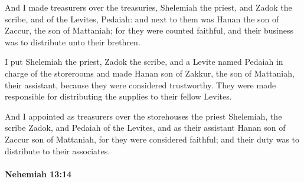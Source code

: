 			\begin{versebox}
					\item[BHS] 
					\item[LXX] 
					\item[ASV] And I made treasurers over the treasuries, Shelemiah the priest, and Zadok the scribe, and of the Levites, Pedaiah: and next to them was Hanan the son of Zaccur, the son of Mattaniah; for they were counted faithful, and their business was to distribute unto their brethren.
					\item[NIV] I put Shelemiah the priest, Zadok the scribe, and a Levite named Pedaiah in charge of the storerooms and made Hanan son of Zakkur, the son of Mattaniah, their assistant, because they were considered trustworthy. They were made responsible for distributing the supplies to their fellow Levites.
					\item[NRSV] And I appointed as treasurers over the storehouses the priest Shelemiah, the scribe Zadok, and Pedaiah of the Levites, and as their assistant Hanan son of Zaccur son of Mattaniah, for they were considered faithful; and their duty was to distribute to their associates.
			\end{versebox}

		\paragraph{Nehemiah 13:14} %
			\label{NEHEMIAH-13-14}

